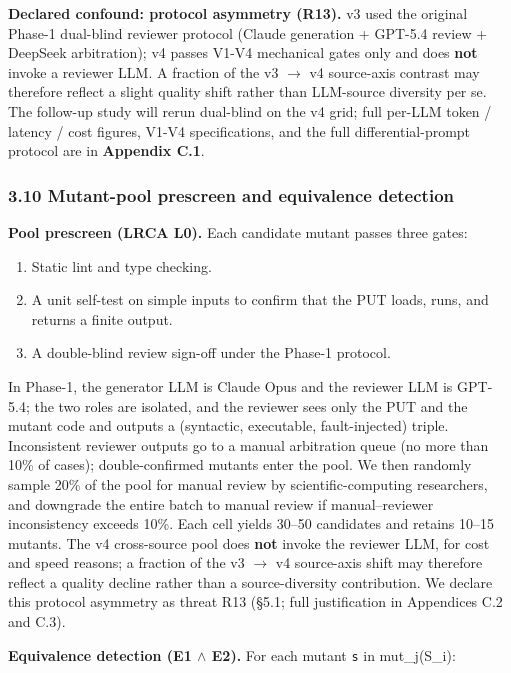 \documentclass[review,12pt,authoryear]{elsarticle}
\providecommand{\tightlist}{\setlength{\itemsep}{0pt}\setlength{\parskip}{0pt}}
\begin{document}
\textbf{Declared confound: protocol asymmetry (R13).} v3 used the
original Phase-1 dual-blind reviewer protocol (Claude generation +
GPT-5.4 review + DeepSeek arbitration); v4 passes V1-V4 mechanical gates
only and does \textbf{not} invoke a reviewer LLM. A fraction of the v3 $\to$
v4 source-axis contrast may therefore reflect a slight quality shift
rather than LLM-source diversity per se. The follow-up study will rerun
dual-blind on the v4 grid; full per-LLM token / latency / cost figures,
V1-V4 specifications, and the full differential-prompt protocol are in
\textbf{Appendix C.1}.

\subsubsection{3.10 Mutant-pool prescreen and equivalence detection}\label{mutant-pool-prescreen-and-equivalence-detection}

\textbf{Pool prescreen (LRCA L0).} Each candidate mutant passes three
gates:
\begin{enumerate}
\tightlist
\item Static lint and type checking.
\item A unit self-test on simple inputs to confirm that the PUT loads,
  runs, and returns a finite output.
\item A double-blind review sign-off under the Phase-1 protocol.
\end{enumerate} In Phase-1, the generator LLM is Claude Opus and the reviewer
LLM is GPT-5.4; the two roles are isolated, and the reviewer sees only
the PUT and the mutant code and outputs a (syntactic, executable,
fault-injected) triple. Inconsistent reviewer outputs go to a manual
arbitration queue (no more than 10\% of cases); double-confirmed mutants
enter the pool. We then randomly sample 20\% of the pool for manual
review by scientific-computing researchers, and downgrade the entire
batch to manual review if manual--reviewer inconsistency exceeds 10\%.
Each cell yields 30--50 candidates and retains 10--15 mutants. The v4
cross-source pool does \textbf{not} invoke the reviewer LLM, for cost
and speed reasons; a fraction of the v3 $\to$ v4 source-axis shift may
therefore reflect a quality decline rather than a source-diversity
contribution. We declare this protocol asymmetry as threat R13 (§5.1;
full justification in Appendices C.2 and C.3).

\textbf{Equivalence detection (E1 $\wedge$ E2).} For each mutant
\texttt{s\textquotesingle{}} in mut\_j(S\_i):
\end{document}
